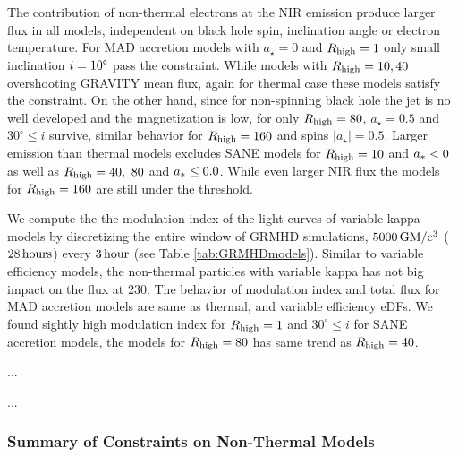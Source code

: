The contribution of non-thermal electrons at the NIR emission produce larger flux in all models, independent on black hole spin, inclination angle or electron temperature. For MAD accretion models with $a_{\star}=0$ and $R_{\rm high}=1$ only small inclination $i=10\degree$ pass the constraint. While models with $R_{\rm high}=10,40$ overshooting GRAVITY mean flux, again for thermal case these models satisfy the constraint. On the other hand, since for non-spinning black hole the jet is no well developed and the magnetization is low, for only  $R_{\rm high}=80$, $a_{\star}=0.5$ and $30^{\circ} \leq i$ survive, similar behavior for $R_{\rm high}=160$ and spins $|a_{\star}|=0.5$.
Larger emission than thermal models excludes SANE models for $R_{\rm high}=10$ and $a_* < 0$ as well as  $R_{\rm high}=40,~80$ and $a_* \leq 0.0$. While even larger NIR flux the models for $R_{\rm high}=160$ are still under the threshold.


We compute the the modulation index  of the light curves of variable kappa models by discretizing the entire window of GRMHD simulations, $\rm 5000\,GM/c^3$ ($\rm 28\,hours$) every $\rm 3\,hour$ (see Table \ref{tab:GRMHDmodels}). Similar to variable efficiency models, the non-thermal particles with variable kappa has not big impact on the flux at 230\GHz. The behavior of modulation index and total flux for MAD accretion models are same as thermal, and variable efficiency eDFs. We found sightly high modulation index for $R_{\rm high}=1$ and $30^{\circ} \leq i$ for SANE accretion models, the models for $R_{\rm high}=80$ has same trend as $R_{\rm high}=40$.



...


...

\subsubsection{Summary of Constraints on Non-Thermal Models}

